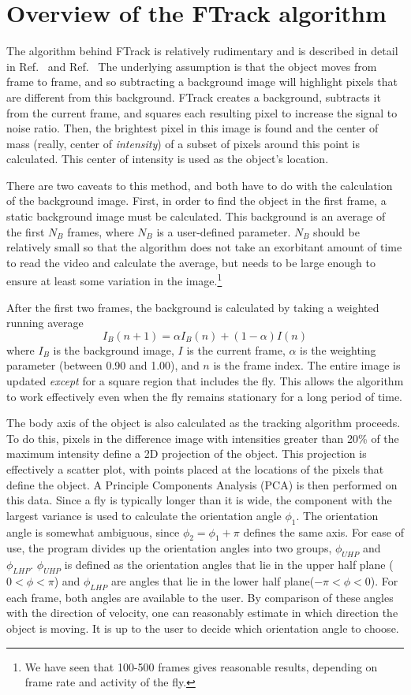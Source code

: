 \documentclass[letterpaper, 11pt]{article}
\begin{document}
\section{Overview of the FTrack algorithm}
\label{Overview} The algorithm behind FTrack is relatively rudimentary and is described in detail
in Ref.\ \cite{valente1} and Ref.\ \cite{valente2} The underlying assumption is that the object
moves from frame to frame, and so subtracting a background image will highlight pixels that are
different from this background. FTrack creates a background, subtracts it from the current frame,
and squares each resulting pixel to increase the signal to noise ratio. Then, the brightest pixel
in this image is found and the center of mass (really, center of \emph{intensity}) of a subset of
pixels around this point is calculated.  This center of intensity is used as the object's location.

There are two caveats to this method, and both have to do with the calculation of the background
image. First, in order to find the object in the first frame, a static background image must be
calculated. This background is an average of the first $N_B$ frames, where $N_B$ is a user-defined
parameter. $N_B$ should be relatively small so that the algorithm does not take an exorbitant
amount of time to read the video and calculate the average, but needs to be large enough to ensure
at least some variation in the image.\footnote{We have seen that 100-500 frames gives reasonable
results, depending on frame rate and activity of the fly.}

After the first two frames, the background is calculated by taking a weighted running average
$$I_{B}(n+1) = \alpha I_{B}(n) + (1-\alpha)I(n)$$
where $I_B$ is the background image, $I$ is the current frame, $\alpha$ is the weighting parameter
(between 0.90 and 1.00), and $n$ is the frame index.  The entire image is updated \emph{except} for
a square region that includes the fly.  This allows the algorithm to work effectively even when the
fly remains stationary for a long period of time.

The body axis of the object is also calculated as the tracking algorithm proceeds.  To do this,
pixels in the difference image with intensities greater than 20\% of the maximum intensity define a
2D projection of the object.  This projection is effectively a scatter plot, with points placed at
the locations of the pixels that define the object. A Principle Components Analysis (PCA) is then
performed on this data. Since a fly is typically longer than it is wide, the component with the
largest variance is used to calculate the orientation angle $\phi_1$. The orientation angle is
somewhat ambiguous, since $\phi_2 = \phi_1+\pi$ defines the same axis. For ease of use, the program
divides up the orientation angles into two groups, $\phi_{UHP}$ and $\phi_{LHP}$.  $\phi_{UHP}$ is
defined as the orientation angles that lie in the upper half plane ($0 < \phi < \pi$) and
$\phi_{LHP}$ are angles that lie in the lower half plane($-\pi < \phi < 0$). For each frame, both
angles are available to the user.  By comparison of these angles with the direction of velocity,
one can reasonably estimate in which direction the object is moving. It is up to the user to decide
which orientation angle to choose.
\end{document}

